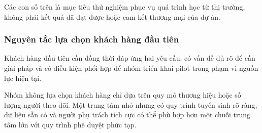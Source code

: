 Các con số trên là mục tiêu thử nghiệm phục vụ quá trình học từ thị trường, không phải kết quả đã đạt được hoặc cam kết thương mại của dự án.

\subsubsection{Nguyên tắc lựa chọn khách hàng đầu tiên}

Khách hàng đầu tiên cần đồng thời đáp ứng hai yêu cầu: có vấn đề đủ rõ để cần giải pháp và có điều kiện phối hợp để nhóm triển khai pilot trong phạm vi nguồn lực hiện tại.

Nhóm không lựa chọn khách hàng chỉ dựa trên quy mô thương hiệu hoặc số lượng người theo dõi. Một trung tâm nhỏ nhưng có quy trình tuyển sinh rõ ràng, dữ liệu sẵn có và người phụ trách tích cực có thể phù hợp hơn một chuỗi trung tâm lớn với quy trình phê duyệt phức tạp.

